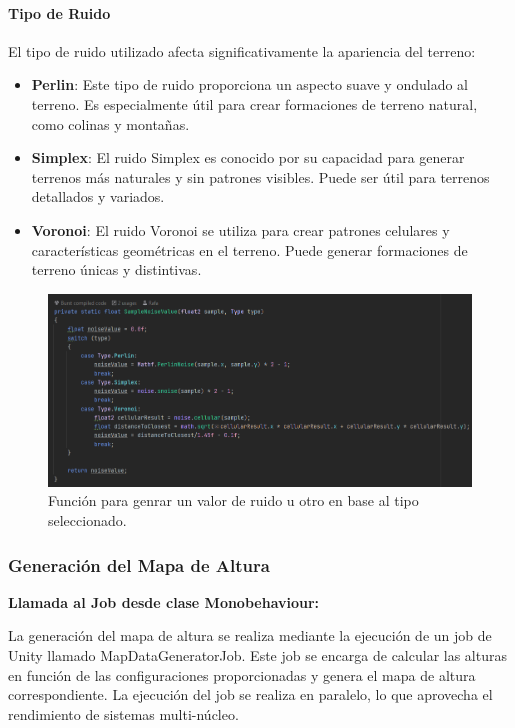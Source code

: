 \paragraph{Tipo de Ruido}

El tipo de ruido utilizado afecta significativamente la apariencia del terreno:

\begin{itemize}
    \item \textbf{Perlin}: Este tipo de ruido proporciona un aspecto suave y ondulado al terreno. Es especialmente útil para crear formaciones de terreno natural, como colinas y montañas.
    
    \item \textbf{Simplex}: El ruido Simplex es conocido por su capacidad para generar terrenos más naturales y sin patrones visibles. Puede ser útil para terrenos detallados y variados.
    
    \item \textbf{Voronoi}: El ruido Voronoi se utiliza para crear patrones celulares y características geométricas en el terreno. Puede generar formaciones de terreno únicas y distintivas.
\end{itemize}

\begin{figure}[h]
    \centering
    \includegraphics[width=1\textwidth]{img/codes/TiposRuido.png}
    \caption{Función para genrar un valor de ruido u otro en base al tipo seleccionado.}
\end{figure}

\subsubsection{Generación del Mapa de Altura}

\textbf{Llamada al Job desde clase Monobehaviour:}

La generación del mapa de altura se realiza mediante la ejecución de un job de Unity llamado MapDataGeneratorJob. Este job se encarga de calcular las alturas en función de las configuraciones proporcionadas y genera el mapa de altura correspondiente. La ejecución del job se realiza en paralelo, lo que aprovecha el rendimiento de sistemas multi-núcleo.


